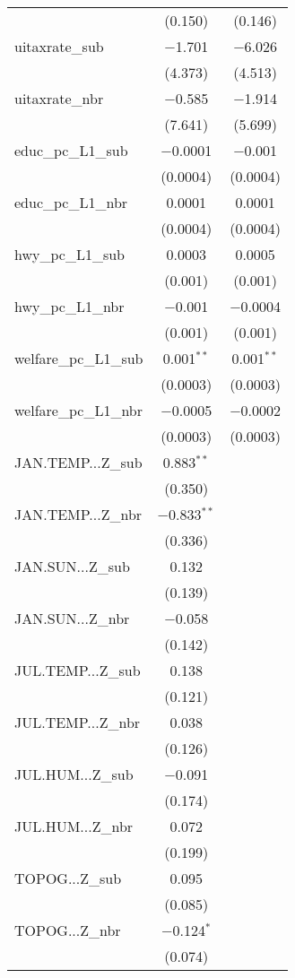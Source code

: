 \begin{table}[!htbp]
\begin{tabular}{@{\extracolsep{5pt}}lcc}
  & (0.150) & (0.146) \\ 
  uitaxrate\_sub & $-$1.701 & $-$6.026 \\ 
  & (4.373) & (4.513) \\ 
  uitaxrate\_nbr & $-$0.585 & $-$1.914 \\ 
  & (7.641) & (5.699) \\ 
  educ\_pc\_L1\_sub & $-$0.0001 & $-$0.001 \\ 
  & (0.0004) & (0.0004) \\ 
  educ\_pc\_L1\_nbr & 0.0001 & 0.0001 \\ 
  & (0.0004) & (0.0004) \\ 
  hwy\_pc\_L1\_sub & 0.0003 & 0.0005 \\ 
  & (0.001) & (0.001) \\ 
  hwy\_pc\_L1\_nbr & $-$0.001 & $-$0.0004 \\ 
  & (0.001) & (0.001) \\ 
  welfare\_pc\_L1\_sub & 0.001$^{**}$ & 0.001$^{**}$ \\ 
  & (0.0003) & (0.0003) \\ 
  welfare\_pc\_L1\_nbr & $-$0.0005 & $-$0.0002 \\ 
  & (0.0003) & (0.0003) \\ 
  JAN.TEMP...Z\_sub & 0.883$^{**}$ &  \\ 
  & (0.350) &  \\ 
  JAN.TEMP...Z\_nbr & $-$0.833$^{**}$ &  \\ 
  & (0.336) &  \\ 
  JAN.SUN...Z\_sub & 0.132 &  \\ 
  & (0.139) &  \\ 
  JAN.SUN...Z\_nbr & $-$0.058 &  \\ 
  & (0.142) &  \\ 
  JUL.TEMP...Z\_sub & 0.138 &  \\ 
  & (0.121) &  \\ 
  JUL.TEMP...Z\_nbr & 0.038 &  \\ 
  & (0.126) &  \\ 
  JUL.HUM...Z\_sub & $-$0.091 &  \\ 
  & (0.174) &  \\ 
  JUL.HUM...Z\_nbr & 0.072 &  \\ 
  & (0.199) &  \\ 
  TOPOG...Z\_sub & 0.095 &  \\ 
  & (0.085) &  \\ 
  TOPOG...Z\_nbr & $-$0.124$^{*}$ &  \\ 
  & (0.074) &  \\ 

\end{tabular}
\end{table}
